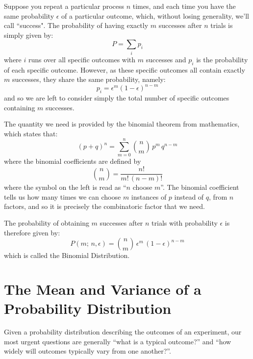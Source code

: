 \documentclass[12pt,oneside]{book}
\begin{document}
Suppose you repeat a particular process $n$ times, and each time you
have the same probability $\epsilon$ of a particular outcome, which,
without losing generality, we'll call ``success".  The probability of
having exactly $m$ successes after $n$ trials is simply given by:
\begin{displaymath}
P = \sum_i p_i
\end{displaymath}
where $i$ runs over all specific outcomes with $m$ successes and $p_i$
is the probability of each specific outcome.  However, as these
specific outcomes all contain exactly $m$ successes, they share the
same probability, namely:
\begin{displaymath}
p_i = \epsilon^m (1 - \epsilon)^{n-m}
\end{displaymath}
and so we are left to consider simply the total number of specific outcomes containing $m$ successes.  

The quantity we need is provided by the binomial theorem from mathematics, which states that:
\begin{equation}
\label{eqn:binomt}
(p+q)^n = \sum_{m=0}^{n} \binom{n}{m} \, p^m \, q^{n-m}
\end{equation}
where the binomial coefficients are defined by
\begin{equation}
\label{eqn:binomc}
\binom{n}{m} = \frac{n!}{m! \, (n-m)!}
\end{equation}
where the symbol on the left is read as ``$n$ choose $m$''.  The
binomial coefficient tells us how many times we can choose $m$
instances of $p$ instead of $q$, from $n$ factors, and so it is
precisely the combinatoric factor that we need.

The probability of obtaining $m$ successes after $n$ trials with
probability $\epsilon$ is therefore given by:
\begin{equation}
\label{eqn:binom}
P(m; \, n ,\epsilon) = \binom{n}{m} \, \epsilon^m \, (1 - \epsilon)^{n-m}
\end{equation}
which is called the Binomial Distribution.

\section{The Mean and Variance of a Probability Distribution}

Given a probability distribution describing the outcomes of an
experiment, our most urgent questions are generally ``what is a
typical outcome?'' and ``how widely will outcomes typically vary from
one another?''.
\end{document}

